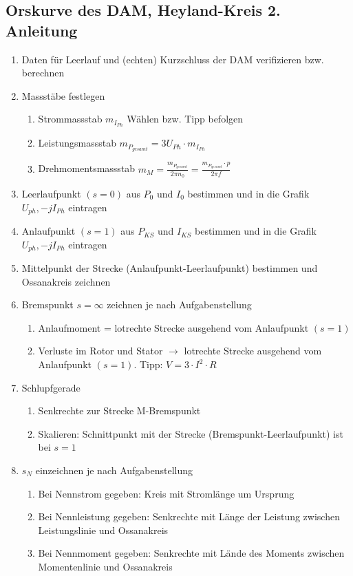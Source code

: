         \newpage
    \subsection{Orskurve des DAM, Heyland-Kreis 2. Anleitung}
    \begin{enumerate}
      \item Daten für Leerlauf und (echten) Kurzschluss der DAM verifizieren
      bzw. berechnen
      \item Massstäbe festlegen
      \begin{enumerate}
        \item Strommassstab $m_{I_{Ph}}$ Wählen bzw. Tipp befolgen
        \item Leistungsmassstab $m_{P_{gesamt}}=3U_{Ph}\cdot m_{I_{Ph}}$
        \item Drehmomentsmassstab $m_M=\frac{m_{P_{gesamt}}}{2\pi n_0} =
        \frac{m_{P_{gesamt}}\cdot p}{2\pi f}$
      \end{enumerate}
      \item Leerlaufpunkt $(s=0)$ aus $P_0$ und $I_0$ bestimmen und in die
      Grafik $U_{ph},-jI_{Ph}$ eintragen
      \item Anlaufpunkt $(s=1)$ aus $P_{KS}$ und $I_{KS}$ bestimmen und in die
      Grafik $U_{ph},-jI_{Ph}$ eintragen
      \item Mittelpunkt der Strecke (Anlaufpunkt-Leerlaufpunkt) bestimmen und
      Ossanakreis zeichnen
      \item Bremspunkt $s=\infty$ zeichnen je nach Aufgabenstellung
      \begin{enumerate}
        \item Anlaufmoment = lotrechte Strecke ausgehend vom Anlaufpunkt $(s=1)$
        \item Verluste im Rotor und Stator $\rightarrow$ lotrechte Strecke
        ausgehend vom Anlaufpunkt $(s=1)$. Tipp: $V=3\cdot I^2\cdot R$
      \end{enumerate}
      \item Schlupfgerade
      \begin{enumerate}
        \item Senkrechte zur Strecke M-Bremspunkt
        \item Skalieren: Schnittpunkt mit der Strecke
        (Bremspunkt-Leerlaufpunkt) ist bei $s=1$
      \end{enumerate}
      \item $s_N$ einzeichnen je nach Aufgabenstellung
      \begin{enumerate}
        \item Bei Nennstrom gegeben: Kreis mit Stromlänge um Ursprung
        \item Bei Nennleistung gegeben: Senkrechte mit Länge der Leistung
        zwischen Leistungslinie und Ossanakreis
        \item Bei Nennmoment gegeben: Senkrechte mit Lände des Moments zwischen
        Momentenlinie und Ossanakreis
      \end{enumerate}
    \end{enumerate}   

